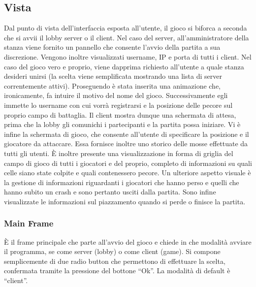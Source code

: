 \subsection{Vista}


Dal punto di vista dell'interfaccia esposta all’utente, il gioco si biforca a seconda che
si avvii il lobby server o il client. Nel caso del server, all’amministratore della stanza
viene fornito un pannello che consente l’avvio della partita a sua discrezione. Vengono
inoltre visualizzati username, IP e porta di tutti i client.
Nel caso del gioco vero e proprio, viene dapprima richiesto all’utente a quale stanza
desideri unirsi (la scelta viene semplificata mostrando una lista di server correntemente attivi).
Proseguendo è stata inserita una animazione che, ironicamente, fa intuire il motivo del nome del gioco.
Successivamente egli immette lo username con cui vorrà registrarsi e la posizione delle pecore sul
proprio campo di battaglia. Il client mostra dunque una schermata di attesa, prima
che la lobby gli comunichi i partecipanti e la partita possa iniziare.
Vi è infine la schermata di gioco, che consente all’utente di specificare la posizione e
il giocatore da attaccare. Essa fornisce inoltre uno storico delle mosse effettuate da
tutti gli utenti. È inoltre presente una visualizzazione in forma di griglia del campo
di gioco di tutti i giocatori e del proprio, completo di informazioni su quali celle siano
state colpite e quali contenessero pecore. Un ulteriore aspetto visuale è la gestione
di informazioni riguardanti i giocatori che hanno perso e quelli che hanno subito un
crash e sono pertanto usciti dalla partita. Sono infine visualizzate le informazioni sul
piazzamento quando si perde o finisce la partita.


\iffalse

\subsubsection{Main Frame}
\label{subsubsection:progettazione_main_frame}
È il frame principale che parte all'avvio del gioco e chiede in che modalità
avviare il programma, se come server (lobby) o come client (game).\newline
Si compone semplicemente di due radio button che permettono di effettuare la
scelta, confermata tramite la pressione del bottone ``Ok''. La modalità di
default è ``client''.



